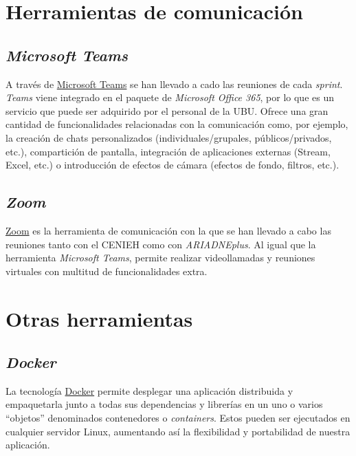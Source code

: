 \section{Herramientas de comunicación}

\subsection{\emph{Microsoft Teams}}

A través de
\href{https://www.microsoft.com/es-es/education/products/teams}{Microsoft
Teams} se han llevado a cado las reuniones de cada \emph{sprint}.
\emph{Teams} viene integrado en el paquete de \emph{Microsoft Office
365}, por lo que es un servicio que puede ser adquirido por el personal
de la UBU. Ofrece una gran cantidad de funcionalidades relacionadas con
la comunicación como, por ejemplo, la creación de chats personalizados
(individuales/grupales, públicos/privados, etc.), compartición de
pantalla, integración de aplicaciones externas (Stream, Excel, etc.) o
introducción de efectos de cámara (efectos de fondo, filtros, etc.).

\subsection{\emph{Zoom}}

\href{https://www.microsoft.com/es-es/education/products/teams}{Zoom}
es la herramienta de comunicación con la que se han llevado a cabo las reuniones tanto con el
CENIEH como con \emph{ARIADNEplus}. Al igual que la herramienta \emph{Microsoft
Teams}, permite realizar videollamadas y reuniones virtuales con
multitud de funcionalidades extra.

\section{Otras herramientas}

\subsection{\emph{Docker}}

La tecnología \href{https://www.docker.com/}{Docker} permite desplegar
una aplicación distribuida y empaquetarla junto a todas sus dependencias
y librerías en un uno o varios ``objetos'' denominados contenedores o
\emph{containers}. Estos pueden ser ejecutados en cualquier servidor
Linux, aumentando así la flexibilidad y portabilidad de nuestra
aplicación.

